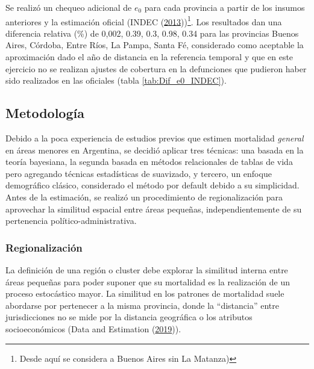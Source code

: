 \documentclass[12pt,]{article}
\begin{document}
Se realizó un chequeo adicional de \(e_0\) para cada provincia a partir
de los insumos anteriores y la estimación oficial (INDEC
(\protect\hyperlink{ref-INDEC2013}{2013}))\footnote{Desde aquí se
  considera a Buenos Aires sin La Matanza)}. Los resultados dan una
diferencia relativa (\%) de 0,002, 0.39, 0.3, 0.98, 0.34 para las
provincias Buenos Aires, Córdoba, Entre Ríos, La Pampa, Santa Fé,
considerado como aceptable la aproximación dado el año de distancia en
la referencia temporal y que en este ejercicio no se realizan ajustes de
cobertura en la defunciones que pudieron haber sido realizados en las
oficiales (tabla \ref{tab:Dif_e0_INDEC}).

\hypertarget{metodologuxeda}{%
\subsection{\texorpdfstring{\textbf{Metodología}}{Metodología}}\label{metodologuxeda}}

Debido a la poca experiencia de estudios previos que estimen mortalidad
\emph{general} en áreas menores en Argentina, se decidió aplicar tres
técnicas: una basada en la teoría bayesiana, la segunda basada en
métodos relacionales de tablas de vida pero agregando técnicas
estadísticas de suavizado, y tercero, un enfoque demográfico clásico,
considerado el método por default debido a su simplicidad. Antes de la
estimación, se realizó un procedimiento de regionalización para
aprovechar la similitud espacial entre áreas pequeñas,
independientemente de su pertenencia político-administrativa.

\hypertarget{regionalizaciuxf3n}{%
\subsubsection{\texorpdfstring{\textbf{Regionalización}}{Regionalización}}\label{regionalizaciuxf3n}}

La definición de una región o cluster debe explorar la similitud interna
entre áreas pequeñas para poder suponer que su mortalidad es la
realización de un proceso estocástico mayor. La similitud en los
patrones de mortalidad suele abordarse por pertenecer a la misma
provincia, donde la ``distancia'' entre jurisdicciones no se mide por la
distancia geográfica o los atributos socioeconómicos (Data and
Estimation (\protect\hyperlink{ref-Longford2005}{2019})).
\end{document}
